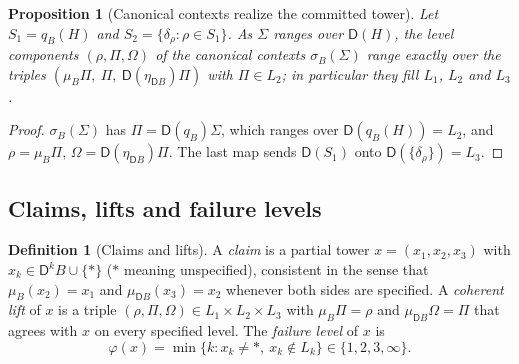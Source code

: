 \documentclass[11pt]{article}
\newtheorem{proposition}[theorem]{Proposition}
\theoremstyle{definition}
\newtheorem{definition}[theorem]{Definition}
\theoremstyle{remark}
\newcommand{\D}{\mathsf{D}}
\begin{document}
\begin{proposition}[Canonical contexts realize the committed tower]\label{prop:committed}
Let $S_1=q_B(H)$ and $S_2=\{\delta_\rho:\rho\in S_1\}$. As $\Sigma$ ranges over $\D(H)$, the level
components $(\rho,\Pi,\Omega)$ of the canonical contexts $\sigma_B(\Sigma)$ range exactly over the
triples $(\mu_B\Pi,\ \Pi,\ \D(\eta_{\D B})\Pi)$ with $\Pi\in L_2$; in particular they fill $L_1$, $L_2$
and $L_3$.
\end{proposition}
\begin{proof}
$\sigma_B(\Sigma)$ has $\Pi=\D(q_B)\Sigma$, which ranges over $\D(q_B(H))=L_2$, and $\rho=\mu_B\Pi$,
$\Omega=\D(\eta_{\D B})\Pi$. The last map sends $\D(S_1)$ onto $\D(\{\delta_\rho\})=L_3$.
\end{proof}

\subsection{Claims, lifts and failure levels}

\begin{definition}[Claims and lifts]
A \emph{claim} is a partial tower $x=(x_1,x_2,x_3)$ with $x_k\in\D^kB\cup\{\ast\}$ ($\ast$ meaning
unspecified), consistent in the sense that $\mu_B(x_2)=x_1$ and $\mu_{\D B}(x_3)=x_2$ whenever both
sides are specified. A \emph{coherent lift} of $x$ is a triple $(\rho,\Pi,\Omega)\in L_1\times L_2\times
L_3$ with $\mu_B\Pi=\rho$ and $\mu_{\D B}\Omega=\Pi$ that agrees with $x$ on every specified level.
The \emph{failure level} of $x$ is
\[
\varphi(x)=\min\{k: x_k\neq\ast,\ x_k\notin L_k\}\in\{1,2,3,\infty\}.
\]
\end{definition}
\end{document}
